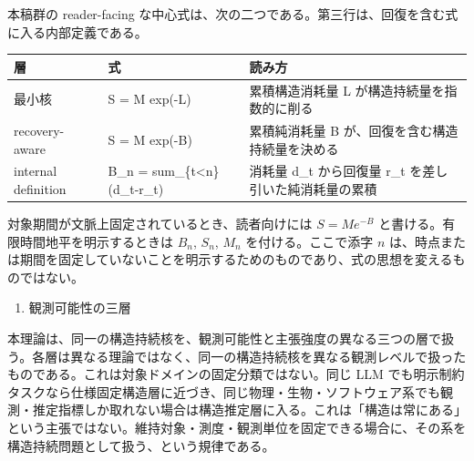 \documentclass[12pt,a4paper]{article}
\begin{document}
本稿群の reader-facing な中心式は、次の二つである。第三行は、回復を含む式に入る内部定義である。

{\def\LTcaptype{table} %
\begin{longtable}[]{@{}
  >{\raggedright\arraybackslash}p{}
  >{\raggedright\arraybackslash}p{}
  >{\raggedright\arraybackslash}p{}@{}}
\toprule\noalign{}
\begin{minipage}[b]{\linewidth}\raggedright
層
\end{minipage} & \begin{minipage}[b]{\linewidth}\raggedright
式
\end{minipage} & \begin{minipage}[b]{\linewidth}\raggedright
読み方
\end{minipage} \\
\midrule\noalign{}
\endhead
\bottomrule\noalign{}
\endlastfoot
最小核 & S = M exp(-L) & 累積構造消耗量 L が構造持続量を指数的に削る \\
recovery-aware & S = M exp(-B) & 累積純消耗量 B が、回復を含む構造持続量を決める \\
internal definition & B\_n = sum\_\{t\textless n\}(d\_t-r\_t) & 消耗量 d\_t から回復量 r\_t を差し引いた純消耗量の累積 \\
\end{longtable}
}

対象期間が文脈上固定されているとき、読者向けには \(S=Me^{-B}\) と書ける。有限時間地平を明示するときは \(B_{n}\), \(S_{n}\), \(M_{n}\) を付ける。ここで添字 \(n\) は、時点または期間を固定していないことを明示するためのものであり、式の思想を変えるものではない。

\begin{enumerate}
\def\labelenumi{\arabic{enumi}.}
\setcounter{enumi}{5}
\tightlist
\item
  観測可能性の三層
\end{enumerate}

本理論は、同一の構造持続核を、観測可能性と主張強度の異なる三つの層で扱う。各層は異なる理論ではなく、同一の構造持続核を異なる観測レベルで扱ったものである。これは対象ドメインの固定分類ではない。同じ LLM でも明示制約タスクなら仕様固定構造層に近づき、同じ物理・生物・ソフトウェア系でも観測・推定指標しか取れない場合は構造推定層に入る。これは「構造は常にある」という主張ではない。維持対象・測度・観測単位を固定できる場合に、その系を構造持続問題として扱う、という規律である。
\end{document}
